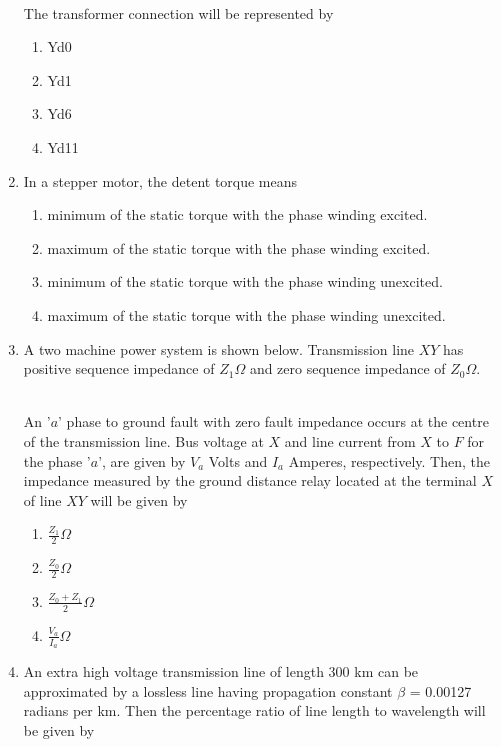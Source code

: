 \documentclass[journal]{IEEEtran}
\begin{document}
\begin{enumerate}
\begin{figure}[!ht]
\centering
\resizebox{0.5\textwidth}{!}{%

}%
\end{figure}\\
The transformer connection will be represented by
\begin{enumerate}
    \item Yd0
    \item Yd1
    \item Yd6
    \item Yd11 \\
\end{enumerate}
\item In a stepper motor, the detent torque means
\begin{enumerate}
    \item minimum of the static torque with the phase winding excited.
    \item maximum of the static torque with the phase winding excited.
    \item minimum of the static torque with the phase winding unexcited.
    \item maximum of the static torque with the phase winding unexcited. \\
\end{enumerate}
\item A two machine power system is shown below. Transmission line $XY$ has positive sequence impedance of $Z_1 \Omega$ and zero sequence impedance of $Z_0 \Omega$. 
\pagebreak
\begin{figure}[!ht]
\centering
\resizebox{0.5\textwidth}{!}{%

}%
\end{figure} \\
An '$a$' phase to ground fault with zero fault impedance occurs at the centre of the transmission line. Bus voltage at $X$ and line current from $X$ to $F$ for the phase '$a$', are given by $V_a$ Volts and $I_a$ Amperes, respectively. Then, the impedance measured by the ground distance relay located at the terminal $X$ of line $XY$ will be given by
\begin{enumerate}
   \item $\frac{Z_1}{2} \Omega$
   \item $\frac{Z_0}{2} \Omega$
   \item $\frac{Z_0+Z_1}{2} \Omega$
   \item $\frac{V_a}{I_a} \Omega$ \\
\end{enumerate}
\item An extra high voltage transmission line of length 300 km can be approximated by a lossless line having propagation constant $\beta$ = 0.00127 radians per km. Then the percentage ratio of line length to wavelength will be given by

\end{enumerate}
\end{document}
